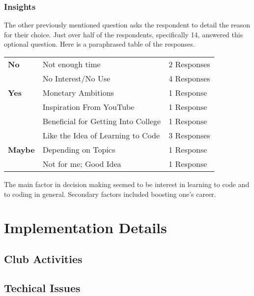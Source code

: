 \documentclass{report}
\begin{document}
        \subsubsection{Insights}

            The other previously mentioned question asks the respondent to detail the reason for their choice. Just over half of the respondents, specifically 14, answered this optional question. Here is a paraphrased table of the responses.

            \begin{center}
                \begin{tabular}{l|l|l}
                \textbf{No}  & Not enough time           & 2 Responses    \\
                             & No Interest/No Use        & 4 Responses    \\ \hline
                \textbf{Yes} & Monetary Ambitions        & 1 Response     \\
                             & Inspiration From YouTube  & 1 Response     \\
                             & Beneficial for Getting Into College & 1 Response \\
                             & Like the Idea of Learning to Code & 3 Responses \\ \hline
                \textbf{Maybe} & Depending on Topics & 1 Response   \\
                               & Not for me; Good Idea & 1 Response \\
                \end{tabular}
            \end{center}

            The main factor in decision making seemed to be interest in learning to code and to coding in general. Secondary factors included boosting one's career.
    \section{Implementation Details}

        \subsection{Club Activities}



        \subsection{Techical Issues}
\end{document}
